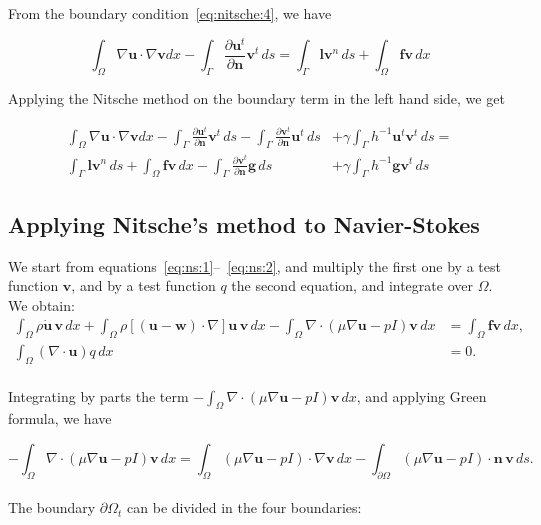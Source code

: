 \documentclass[11pt,a4paper,titlepage]{report}
\begin{document}
From the boundary condition~\eqref{eq:nitsche:4}, we have

\begin{equation}
\int_\Omega \nabla \mathbf{u} \cdot \nabla \mathbf{v} dx
- \int_{\Gamma} \frac{\partial \mathbf{u}^t}{\partial \mathbf{n}} \mathbf{v}^t \, ds
=  \int_{\Gamma} \mathbf{l} \mathbf{v}^n \, ds
+ \int_\Omega \mathbf{fv} \, dx
\end{equation}

Applying the Nitsche method on the boundary term in the left hand side, we get

\begin{align}
\int_\Omega \nabla \mathbf{u} \cdot \nabla \mathbf{v} dx
- \int_{\Gamma} \frac{\partial \mathbf{u}^t}{\partial \mathbf{n}} \mathbf{v}^t \, ds
- \int_{\Gamma} \frac{\partial \mathbf{v}^t}{\partial \mathbf{n}} \mathbf{u}^t \, ds
&+ \gamma \int_{\Gamma} h^{-1} \mathbf{u}^t \mathbf{v}^t \, ds = \\
	 \int_{\Gamma} \mathbf{l} \mathbf{v}^n \, ds
+ \int_\Omega \mathbf{fv} \, dx
 - \int_{\Gamma} \frac{\partial \mathbf{v}^t}{\partial \mathbf{n}} \mathbf{g} \, ds
&+ \gamma \int_{\Gamma} h^{-1} \mathbf{g} \mathbf{v}^t \, ds
\end{align}

\subsection{Applying Nitsche's method to Navier-Stokes}
We start from equations~\eqref{eq:ns:1}--~\eqref{eq:ns:2}, and multiply the first one by a test function $\mathbf{v}$, and by a test function $q$ the second equation, and integrate over $\Omega$. We obtain:
\begin{align*}
\int_{\Omega} \rho \dot{\mathbf{u}} \, \mathbf{v} \, dx
+ \int_{\Omega} \rho [(\mathbf{u - w}) \cdot \nabla] \mathbf{u} \, \mathbf{v} \, dx
- \int_{\Omega} \nabla \cdot (\mu \nabla \mathbf{u} - pI)\mathbf{v} \, dx
&= \int_{\Omega} \mathbf{f} \mathbf{v} \, dx, \\
\int_{\Omega}  (\nabla \cdot \mathbf{u}) q \, dx &= 0.
\end{align*}
\\
Integrating by parts the term $- \int_{\Omega} \nabla \cdot (\mu \nabla \mathbf{u} - pI)\mathbf{v} \, dx$, and applying Green formula, we have

\[
- \int_{\Omega} \nabla \cdot (\mu \nabla \mathbf{u} - pI)\mathbf{v} \, dx =  \int_{\Omega} (\mu \nabla \mathbf{u} - pI) \cdot \nabla \mathbf{v} \, dx - \int_{\partial \Omega} (\mu \nabla \mathbf{u} - pI) \cdot \mathbf{n} \, \mathbf{v} \, ds.
\]
\\
The boundary $\partial \Omega_t$ can be divided in the four boundaries:
\end{document}
